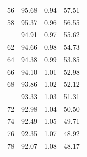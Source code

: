 \documentclass[12pt]{article}
\begin{document}
\begin{minipage}{0.5\textwidth}
\begin{tabular}{rccc}
     56 & 95.68 & 0.94 & 57.51 \\ 
     58 & 95.37 & 0.96 & 56.55 \\ \addlinespace
     60 & 94.91 & 0.97 & 55.62 \\ 
     62 & 94.66 & 0.98 & 54.73 \\ 
     64 & 94.38 & 0.99 & 53.85 \\ 
     66 & 94.10 & 1.01 & 52.98 \\ 
     68 & 93.86 & 1.02 & 52.12 \\ \addlinespace
     70 & 93.33 & 1.03 & 51.31 \\ 
     72 & 92.98 & 1.04 & 50.50 \\ 
     74 & 92.49 & 1.05 & 49.71 \\ 
     76 & 92.35 & 1.07 & 48.92 \\ 
     78 & 92.07 & 1.08 & 48.17 \\ 
\bottomrule
\end{tabular}

\end{minipage} \hfill
\end{document}
